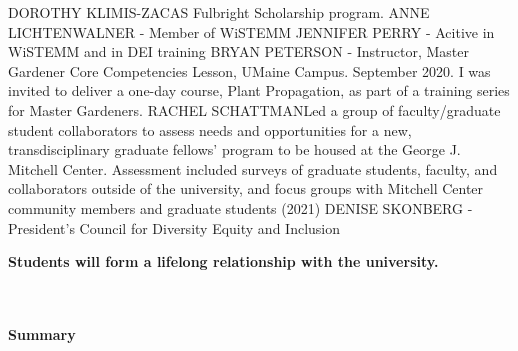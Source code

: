 \documentclass[11pt]{article}
\begin{document}
\begin{description}[topsep=0pt, noitemsep]
\begin{description}[topsep=11pt, noitemsep]
	DOROTHY KLIMIS-ZACAS Fulbright Scholarship program.
	ANNE LICHTENWALNER - Member of WiSTEMM
	JENNIFER PERRY - Acitive in WiSTEMM and in DEI training
	BRYAN PETERSON - Instructor, Master Gardener Core Competencies Lesson, UMaine Campus. September 2020. I was invited to deliver a one-day course, Plant Propagation, as part of a training series for Master Gardeners.
	RACHEL SCHATTMANLed a group of faculty/graduate student collaborators to assess needs and opportunities for a new, transdisciplinary graduate fellows’ program to be housed at the George J. Mitchell Center. Assessment included surveys of graduate students, faculty, and collaborators outside of the university, and focus groups with Mitchell Center community members and graduate students (2021) 
	DENISE SKONBERG - President's Council for Diversity Equity and Inclusion
	
\item[\textbf{3.2}] \textbf{Students will form a lifelong relationship with the university.}\\~\\
\end{description}
\end{description}~\\
\textbf{Summary}\\~\\
\end{document}
